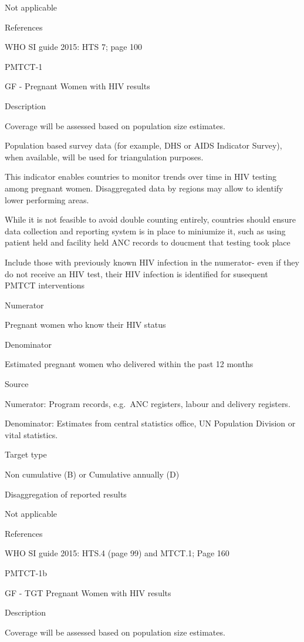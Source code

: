 \documentclass[]{book}
\begin{document}
Not applicable

References

WHO SI guide 2015: HTS 7; page 100

PMTCT-1

GF - Pregnant Women with HIV results

Description

Coverage will be assessed based on population size estimates.

Population based survey data (for example, DHS or AIDS Indicator Survey), when available, will be used for triangulation purposes.

This indicator enables countries to monitor trends over time in HIV testing among pregnant women. Disaggregated data by regions may allow to identify lower performing areas.

While it is not feasible to avoid double counting entirely, countries should ensure data collection and reporting system is in place to miniumize it, such as using patient held and facility held ANC records to doucment that testing took place

Include those with previously known HIV infection in the numerator- even if they do not receive an HIV test, their HIV infection is identified for susequent PMTCT interventions

Numerator

Pregnant women who know their HIV status

Denominator

Estimated pregnant women who delivered within the past 12 months

Source

Numerator: Program records, e.g.~ANC registers, labour and delivery registers.

Denominator: Estimates from central statistics office, UN Population Division
or vital statistics.

Target type

Non cumulative (B) or Cumulative annually (D)

Disaggregation of reported results

Not applicable

References

WHO SI guide 2015: HTS.4 (page 99) and MTCT.1; Page 160

PMTCT-1b

GF - TGT Pregnant Women with HIV results

Description

Coverage will be assessed based on population size estimates.
\end{document}
